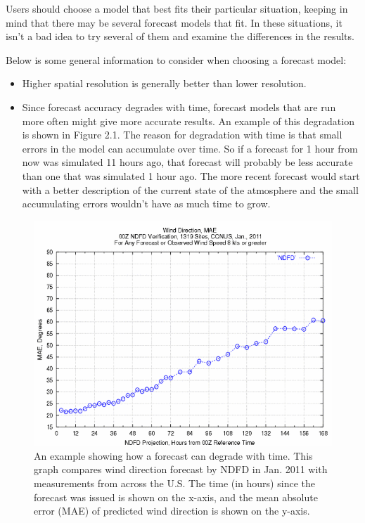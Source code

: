 \documentclass[12pt]{article}
\begin{document}
Users should choose a model that best fits their particular situation, keeping in mind that there may be several forecast models that fit.  In these situations, it isn't a bad idea to try several of them and examine the differences in the results.


Below is some general information to consider when choosing a forecast model:
\begin{itemize}
\item Higher spatial resolution is generally better than lower resolution.
\item Since forecast accuracy degrades with time, forecast models that are run more often might give more accurate results.  An example of this degradation is shown in Figure 2.1.  The reason for degradation with time is that small errors in the model can accumulate over time.  So if a forecast for 1 hour from now was simulated 11 hours ago, that forecast will probably be less accurate than one that was simulated 1 hour ago.  The more recent forecast would start with a better description of the current state of the atmosphere and the small accumulating errors wouldn't have as much time to grow.
\end{itemize}


\begin{figure}[H]
	\centering
	\label{ndfd_degrade}
	\includegraphics[scale=0.75]{degrade_w_time}
	\caption*{An example showing how a forecast can degrade with time.  This graph compares wind direction forecast by NDFD in Jan. 2011 with measurements from across the U.S.  The time (in hours) since the forecast was issued is shown on the x-axis, and the mean absolute error (MAE) of predicted wind direction is shown on the y-axis.}
\end{figure}
\end{document}

